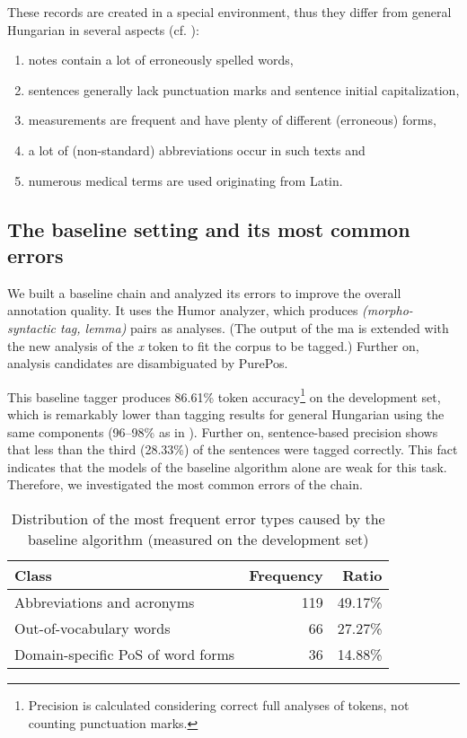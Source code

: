 These records are created in a special environment, thus they differ from general Hungarian in several aspects (cf. \cite{Orosz2013a,Siklosi2013b,Siklosi2012}):

\begin{enumerate} %
 \item notes contain a lot of erroneously spelled words,
 \item sentences generally lack punctuation marks and sentence initial capitalization, 
 \item measurements are frequent and have plenty of different (erroneous) forms,
 \item a lot of (non-standard) abbreviations occur in such texts and
 \item numerous medical terms are used originating from Latin.
\end{enumerate}

\subsection{The baseline setting and its most common errors}
\label{sec:baseline}

We built a baseline chain and analyzed its errors to improve the overall annotation quality.
It uses the Humor analyzer, which produces \emph{(morpho-syntactic tag, lemma)} pairs as analyses. 
(The output of the \acrshort{ma} is extended with the new analysis of the \textit{x} token to fit the corpus to be tagged.)
Further on, analysis candidates are disambiguated by PurePos. 

This baseline tagger produces 86.61\% token accuracy\footnote{Precision is calculated considering correct full analyses of tokens, not counting punctuation marks.} on the development set, which is remarkably lower than tagging results for general Hungarian using the same components (96--98\% as in \cite{Orosz2013b,zsibrata2013magyarlanc}). 
Further on, sentence-based precision shows that less than the third (28.33\%) of the sentences were tagged correctly. 
This fact indicates that the models of the baseline algorithm alone are weak for this task. 
Therefore, we investigated the most common errors of the chain.

\begin{table}[H]
\centering
\caption{Distribution of the most frequent error types caused by the baseline algorithm (measured on the development set)}
\label{tab:error_types}
\begin{tabular}{ l r r } 
\hline
Class & Frequency & Ratio \\
\hline
Abbreviations and acronyms & 119 & 49.17\% \\
Out-of-vocabulary words & 66 & 27.27\% \\
Domain-specific PoS of word forms & 36 & 14.88\% \\
\hline
\end{tabular}
\end{table}

